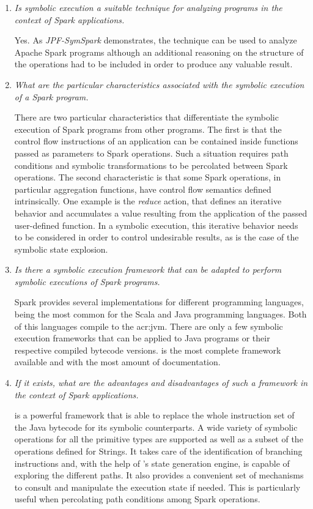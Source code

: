 \begin{enumerate}
	\item \textit{Is symbolic execution a suitable technique for analyzing programs in the context of Spark applications.} 
	
	Yes. As \textit{JPF-SymSpark} demonstrates, the technique can be used to analyze Apache Spark programs although an additional reasoning on the structure of the operations had to be included in order to produce any valuable result.
	
	\item \textit{What are the particular characteristics associated with the symbolic execution of a Spark program.}
	
	There are two particular characteristics that differentiate the symbolic execution of Spark programs from other programs. The first is that the control flow instructions of an application can be contained inside functions passed as parameters to Spark operations. Such a situation requires path conditions and symbolic transformations to be percolated between Spark operations. The second characteristic is that some Spark operations, in particular aggregation functions, have control flow semantics defined intrinsically. One example is the \textit{reduce} action, that defines an iterative behavior and accumulates a value resulting from the application of the passed user-defined function. In a symbolic execution, this iterative behavior needs to be considered in order to control undesirable results, as is the case of the symbolic state explosion.
	
	\item \textit{Is there a symbolic execution framework that can be adapted to perform symbolic executions of Spark programs.}
	
	Spark provides several implementations for different programming languages, being the most common for the Scala and Java programming languages. Both of this languages compile to the \acrlong{acr:jvm}. There are only a few symbolic execution frameworks that can be applied to Java programs or their respective compiled bytecode versions. \spf{} is the most complete framework available and with the most amount of documentation.
	
	\item \textit{If it exists, what are the advantages and disadvantages of such a framework in the context of Spark applications.}
	
	\spf{} is a powerful framework that is able to replace the whole instruction set of the Java bytecode for its symbolic counterparts. A wide variety of symbolic operations for all the primitive types are supported as well as a subset of the operations defined for Strings. It takes care of the identification of branching instructions and, with the help of \jpf{}'s state generation engine, is capable of exploring the different paths. It also provides a convenient set of mechanisms to consult and manipulate the execution state if needed. This is particularly useful when percolating path conditions among Spark operations. 
	

\end{enumerate}
